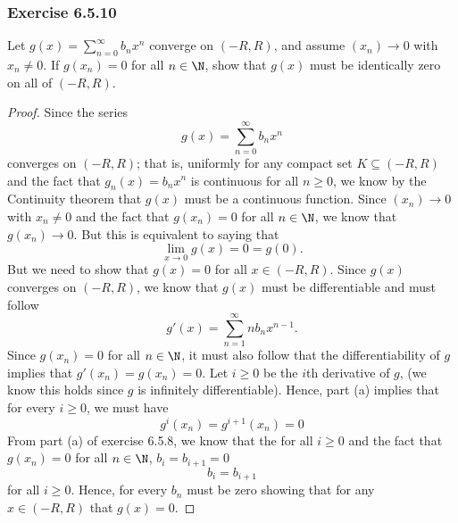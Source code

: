 \subsubsection{Exercise 6.5.10}  Let \( g(x) = \sum_{ n=0  }^{ \infty  } b_n x^n  \) converge on \( (-R ,R ) \), and assume \( (x_n) \to 0  \) with \( x_n \neq 0  \). If \( g(x_n) = 0  \) for all \( n \in \N  \), show that \( g(x)  \) must be identically zero on all of \( (-R ,R ) \).
\begin{proof}
Since the series 
\[  g(x) = \sum_{ n=0 }^{ \infty  } b_n x^n  \] converges on \( (-R ,R ) \); that is, uniformly for any compact set \( K \subseteq (-R ,R ) \) and the fact that \( g_n(x) = b_n x^n  \) is continuous for all \( n \geq 0  \), we know by the Continuity theorem that \( g(x)  \) must be a continuous function. Since \( (x_n) \to 0 \) with \( x_n \neq 0  \) and the fact that \( g(x_n) = 0  \) for all \( n \in \N  \), we know that \( g(x_n) \to 0  \). But this is equivalent to saying that 
\[  \lim_{ x \to 0  } g(x) = 0 = g(0).\]
But we need to show that \( g(x) = 0  \) for all \( x \in (-R ,R ) \). Since \( g(x)  \) converges on \( (-R ,R ) \), we know that \( g(x) \) must be differentiable and must follow 
\[  g'(x) = \sum_{ n=1  }^{ \infty  } n b_n x^{n-1}. \]
Since \( g(x_n) = 0  \) for all \( n \in \N  \), it must also follow that the differentiability of \( g  \) implies that \( g'(x_n) = g(x_n) = 0  \). Let \( i \geq 0  \) be the \( i \)th derivative of \( g \), (we know this holds since \( g \) is infinitely differentiable). Hence, part (a) implies that for every \( i \geq 0  \), we must have 
\[ g^{i} (x_{n})  = g^{i+1} (x_{n}) = 0  \] From part (a) of exercise 6.5.8, we know that the for all \( i \geq 0   \) and the fact that \( g(x_n) = 0  \) for all \( n \in \N  \), \( b_i = b_{i+1} = 0  \)   
\[  b_i = b_{i+1} \]  for all \( i \geq 0  \). Hence, for every \( b_n  \) must be zero showing that for any \( x \in (-R ,R ) \) that \( g(x) = 0  \).
\end{proof}

